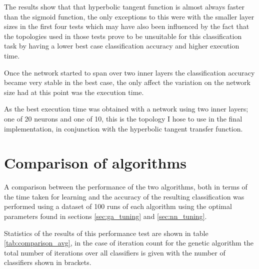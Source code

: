 \documentclass[a4paper]{article}
\begin{document}
The results show that that hyperbolic tangent function is almost always faster
than the sigmoid function, the only exceptions to this were with the smaller
layer sizes in the first four tests which may have also been influenced by the
fact that the topologies used in those tests prove to be unsuitable for this
classification task by having a lower best case classification accuracy and
higher execution time.

Once the network started to span over two inner layers the classification
accuracy became very stable in the best case, the only affect the variation on
the network size had at this point was the execution time.

As the best execution time was obtained with a network using two inner layers;
one of 20 neurons and one of 10, this is the topology I hose to use in the final
implementation, in conjunction with the hyperbolic tangent transfer function.

\section{Comparison of algorithms}
\label{sec:comparison}

A comparison between the performance of the two algorithms, both in terms of the
time taken for learning and the accuracy of the resulting classification was
performed using a dataset of 100 runs of each algorithm using the optimal
parameters found in sections \ref{sec:ga_tuning} and \ref{sec:nn_tuning}.

Statistics of the results of this performance test are shown in table
\ref{tab:comparison_avg}, in the case of iteration count for the genetic
algorithm the total number of iterations over all classifiers is given with the
number of classifiers shown in brackets.
\end{document}
